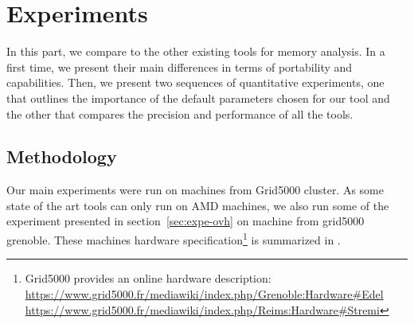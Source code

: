 \section{Experiments}
\label{sec:expe}

In this part, we compare \Moca to the other existing tools for memory analysis. In a first time, we present their main differences in terms of portability
and capabilities. Then, we present two sequences of quantitative experiments, one that outlines the importance of the default parameters chosen for our tool
and the other that compares the precision and performance of all the tools.


\subsection{Methodology}
\label{sec:exp-methodo}


Our main experiments were run on  machines from Grid5000 \Edel
cluster.
    As some state of the art tools can only run on AMD machines, we also run
    some of the experiment presented in section~\ref{sec:expe-ovh} on
    \Stremi machine from grid5000 grenoble.
    These machines hardware specification\footnote{Grid5000 provides an online hardware description:\\
        \url{https://www.grid5000.fr/mediawiki/index.php/Grenoble:Hardware\#Edel}
        \\\url{https://www.grid5000.fr/mediawiki/index.php/Reims:Hardware\#Stremi}} is summarized in
    .


